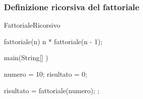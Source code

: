 \begin{frame}[fragile]\frametitle{Definizione ricorsiva del fattoriale}

  \begin{JavaCodePlain}[commandchars=\\!|]
  \Jpublic \Jclass FattorialeRicorsivo {

    \Jpublic \Jstatic \Jint fattoriale(\Jint n) {
      \Jreturn n * fattoriale(n - 1);
    }

    \Jpublic \Jstatic \Jvoid main(String[] \Jargs) {
      \Jint numero = 10;
      \Jint risultato = 0;
      
      risultato = fattoriale(numero);
      ;
    }
  }
  \end{JavaCodePlain}
\end{frame}